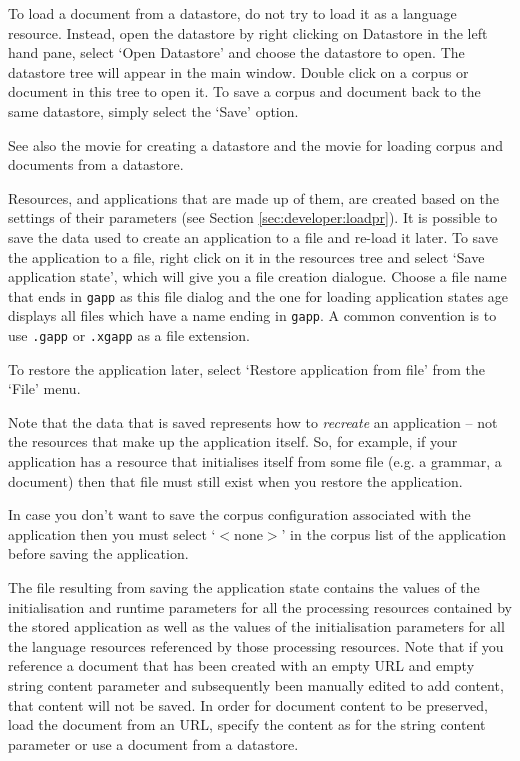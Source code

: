 To load a document from a datastore, do not try to load it as a language
resource. Instead, open the datastore by right clicking on Datastore in the
left hand pane, select `Open Datastore' and choose the datastore to open.
The datastore tree will appear in the main window. Double click on a corpus or
document in this tree to open it. To save a corpus and document back to the same
datastore, simply select the `Save' option.

See also the 
{movie for creating a datastore} and the
{movie for loading corpus and documents from a datastore}.



Resources, and applications that are made up of them,
are created based on the settings of their parameters (see Section
\ref{sec:developer:loadpr}). It is possible to save the data used to create
an application to a file and re-load it later. To save the
application to a file, right click on it in the resources tree and select
`Save application state', which will give you a file creation dialogue.
Choose a file name that ends in \texttt{gapp} as this file dialog and
the one for loading application states age displays all files which
have a name ending in \texttt{gapp}. A common convention is to 
use \texttt{.gapp} or \texttt{.xgapp} as a file extension.

To restore the application later, select `Restore application from file'
from the `File' menu.

Note that the data that is saved represents how to {\it recreate} an
application -- not the resources that make up the application itself. So,
for example, if your application has a resource that initialises itself from
some file (e.g. a grammar, a document) then that file must still exist when
you restore the application.

In case you don't want to save the corpus configuration associated with the
application then you must select `$<$none$>$' in the corpus list of the
application before saving the application.

The file resulting from saving the application state contains the values of the
initialisation and runtime parameters for all the processing resources contained by the
stored application as well as the values of the initialisation parameters for 
all the language resources referenced by those processing resources. Note that
if you reference a document that has been created with an empty URL and empty
string content parameter and subsequently been manually edited to add content,
that content will not be saved. In order for document content to be preserved,
load the document from an URL, specify the content as for the string content
parameter or use a document from a datastore.

